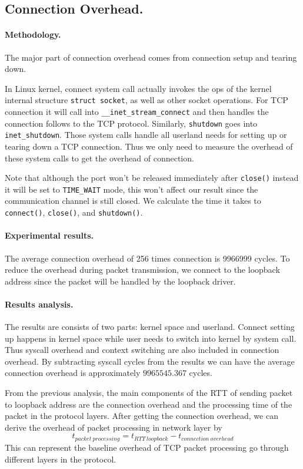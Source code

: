 \subsection{Connection Overhead.} 
\paragraph{Methodology.} The major part of connection overhead comes from connection setup and tearing down. 

In Linux kernel, connect system call actually invokes the ops of the kernel internal structure \texttt{struct socket}, as well as other socket operations. For TCP connection it will call into \texttt{\_\_inet\_stream\_connect} and then handles the connection follows to the TCP protocol. Similarly, \texttt{shutdown} goes into \texttt{inet\_shutdown}. Those system calls handle all userland needs for setting up or tearing down a TCP connection. Thus we only need to measure the overhead of these system calls to get the overhead of connection.

Note that although the port won't be released immediately after \texttt{close()} instead it will be set to \texttt{TIME\_WAIT} mode, this won't affect our result since the communication channel is still closed. We calculate the time it takes to \texttt{connect()}, \texttt{close()}, and \texttt{shutdown()}.

\paragraph{Experimental results.} The average connection overhead of 256 times connection is 9966999 cycles. To reduce the overhead during packet transmission, we connect to the loopback address since the packet will be handled by the loopback driver.

\paragraph{Results analysis.} The results are consists of two parts: kernel space and userland. Connect setting up happens in kernel space while user needs to switch into kernel by system call. Thus syscall overhead and context switching are also included in connection overhead. By subtracting syscall cycles from the results we can have the average connection overhead is approximately $9965545.367$ cycles.

From the previous analysis, the main components of the RTT of sending packet to loopback address are the connection overhead and the processing time of the packet in the protocol layers. After getting the connection overhead, we can derive the overhead of packet processing in network layer by
\begin{equation}
    t_{packet\ processing}=t_{RTT\ loopback}-t_{connection\ overhead}
\end{equation}
This can represent the baseline overhead of TCP packet processing go through different layers in the protocol.
